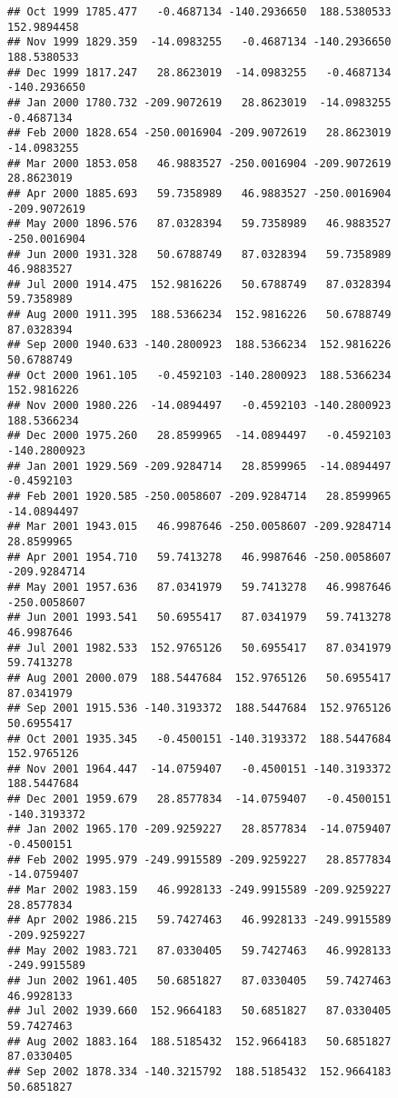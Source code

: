 \documentclass[]{article}
\begin{document}
\begin{verbatim}
## Oct 1999 1785.477   -0.4687134 -140.2936650  188.5380533  152.9894458
## Nov 1999 1829.359  -14.0983255   -0.4687134 -140.2936650  188.5380533
## Dec 1999 1817.247   28.8623019  -14.0983255   -0.4687134 -140.2936650
## Jan 2000 1780.732 -209.9072619   28.8623019  -14.0983255   -0.4687134
## Feb 2000 1828.654 -250.0016904 -209.9072619   28.8623019  -14.0983255
## Mar 2000 1853.058   46.9883527 -250.0016904 -209.9072619   28.8623019
## Apr 2000 1885.693   59.7358989   46.9883527 -250.0016904 -209.9072619
## May 2000 1896.576   87.0328394   59.7358989   46.9883527 -250.0016904
## Jun 2000 1931.328   50.6788749   87.0328394   59.7358989   46.9883527
## Jul 2000 1914.475  152.9816226   50.6788749   87.0328394   59.7358989
## Aug 2000 1911.395  188.5366234  152.9816226   50.6788749   87.0328394
## Sep 2000 1940.633 -140.2800923  188.5366234  152.9816226   50.6788749
## Oct 2000 1961.105   -0.4592103 -140.2800923  188.5366234  152.9816226
## Nov 2000 1980.226  -14.0894497   -0.4592103 -140.2800923  188.5366234
## Dec 2000 1975.260   28.8599965  -14.0894497   -0.4592103 -140.2800923
## Jan 2001 1929.569 -209.9284714   28.8599965  -14.0894497   -0.4592103
## Feb 2001 1920.585 -250.0058607 -209.9284714   28.8599965  -14.0894497
## Mar 2001 1943.015   46.9987646 -250.0058607 -209.9284714   28.8599965
## Apr 2001 1954.710   59.7413278   46.9987646 -250.0058607 -209.9284714
## May 2001 1957.636   87.0341979   59.7413278   46.9987646 -250.0058607
## Jun 2001 1993.541   50.6955417   87.0341979   59.7413278   46.9987646
## Jul 2001 1982.533  152.9765126   50.6955417   87.0341979   59.7413278
## Aug 2001 2000.079  188.5447684  152.9765126   50.6955417   87.0341979
## Sep 2001 1915.536 -140.3193372  188.5447684  152.9765126   50.6955417
## Oct 2001 1935.345   -0.4500151 -140.3193372  188.5447684  152.9765126
## Nov 2001 1964.447  -14.0759407   -0.4500151 -140.3193372  188.5447684
## Dec 2001 1959.679   28.8577834  -14.0759407   -0.4500151 -140.3193372
## Jan 2002 1965.170 -209.9259227   28.8577834  -14.0759407   -0.4500151
## Feb 2002 1995.979 -249.9915589 -209.9259227   28.8577834  -14.0759407
## Mar 2002 1983.159   46.9928133 -249.9915589 -209.9259227   28.8577834
## Apr 2002 1986.215   59.7427463   46.9928133 -249.9915589 -209.9259227
## May 2002 1983.721   87.0330405   59.7427463   46.9928133 -249.9915589
## Jun 2002 1961.405   50.6851827   87.0330405   59.7427463   46.9928133
## Jul 2002 1939.660  152.9664183   50.6851827   87.0330405   59.7427463
## Aug 2002 1883.164  188.5185432  152.9664183   50.6851827   87.0330405
## Sep 2002 1878.334 -140.3215792  188.5185432  152.9664183   50.6851827

\end{verbatim}
\end{document}
